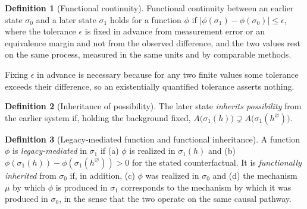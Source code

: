 \documentclass[11pt]{article}
\theoremstyle{definition}
\newtheorem{definition}{Definition}
\theoremstyle{remark}
\begin{document}
\begin{definition}[Functional continuity]\label{def:functional}
Functional continuity between an earlier state $\sigma_0$ and a later state $\sigma_1$ holds for a function $\phi$ if $|\phi(\sigma_1)-\phi(\sigma_0)|\le\epsilon$, where the tolerance $\epsilon$ is fixed in advance from measurement error or an equivalence margin and not from the observed difference, and the two values rest on the same process, measured in the same units and by comparable methods.
\end{definition}

Fixing $\epsilon$ in advance is necessary because for any two finite values some tolerance exceeds their difference, so an existentially quantified tolerance asserts nothing.

\begin{definition}[Inheritance of possibility]\label{def:inhpos}
The later state \emph{inherits possibility} from the earlier system if, holding the background fixed, $A\bigl(\sigma_1(h)\bigr)\supsetneq A\bigl(\sigma_1(h^{\varnothing})\bigr)$.
\end{definition}

\begin{definition}[Legacy-mediated function and functional inheritance]\label{def:funcinh}
A function $\phi$ is \emph{legacy-mediated} in $\sigma_1$ if (a) $\phi$ is realized in $\sigma_1(h)$ and (b) $\phi(\sigma_1(h))-\phi(\sigma_1(h^{\varnothing}))>0$ for the stated counterfactual. It is \emph{functionally inherited} from $\sigma_0$ if, in addition, (c) $\phi$ was realized in $\sigma_0$ and (d) the mechanism $\mu$ by which $\phi$ is produced in $\sigma_1$ corresponds to the mechanism by which it was produced in $\sigma_0$, in the sense that the two operate on the same causal pathway.
\end{definition}
\end{document}
